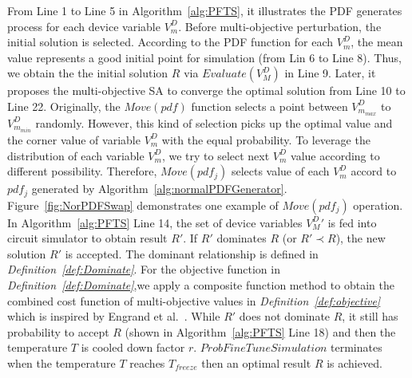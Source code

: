   From Line 1 to Line 5 in Algorithm~\ref{alg:PFTS}, it illustrates the PDF generates process for each device variable $V^D_m$. Before multi-objective perturbation, the initial solution is selected. According to the PDF function for each $V^D_m$, the mean value represents a good initial point for simulation (from Lin 6 to Line 8). Thus, we obtain the the initial solution $R$ via $Evaluate(V^D_M)$ in Line 9. Later, it proposes the multi-objective SA to converge the optimal solution from Line 10 to Line 22. Originally, the $Move(pdf)$ function selects a point between $V^{D}_{m_{max}}$ to $V^{D}_{m_{min}}$ randomly. However, this kind of selection picks up the optimal value and the corner value of variable $V^D_m$ with the equal probability. To leverage the distribution of each variable $V^D_m$, we try to select next $V^D_m$ value according to different possibility. Therefore, $Move(pdf_j)$ selects value of each $V^D_m$ accord to $pdf_j$ generated by Algorithm~\ref{alg:normalPDFGenerator}. Figure~\ref{fig:NorPDFSwap} demonstrates one example of $Move(pdf_j)$ operation. In Algorithm~\ref{alg:PFTS} Line 14, the set of device variables ${V^D_M}'$ is fed into circuit simulator to obtain result $R'$. If $R'$ dominates $R$ (or $R' \prec R$), the new solution $R'$ is accepted. The dominant relationship is defined in {\it Definition~\ref{def:Dominate}}. For the objective function in {\it Definition~\ref{def:Dominate}},we apply a composite function method to obtain the combined cost function of multi-objective values in {\it Definition~\ref{def:objective}} which is inspired by Engrand et al.~\cite{EngrandMOSA}. While $R'$ does not dominate $R$, it still has probability to accept $R$ (shown in Algorithm~\ref{alg:PFTS} Line 18) and then the temperature $T$ is cooled down factor $r$. $ProbFineTuneSimulation$ terminates when the temperature $T$ reaches $T_{freeze}$ then an optimal result $R$ is achieved.


